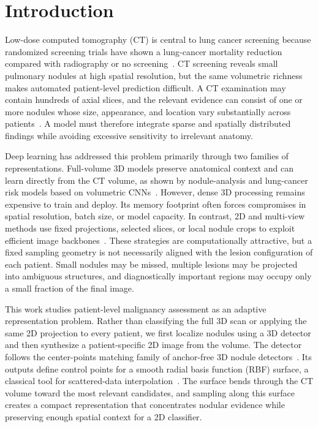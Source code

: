 \documentclass[preprint,12pt]{elsarticle}
\begin{document}
\section{Introduction}

Low-dose computed tomography (CT) is central to lung cancer screening because randomized screening trials have shown a lung-cancer mortality reduction compared with radiography or no screening~\cite{nlst2011,nelson2020}. CT screening reveals small pulmonary nodules at high spatial resolution, but the same volumetric richness makes automated patient-level prediction difficult. A CT examination may contain hundreds of axial slices, and the relevant evidence can consist of one or more nodules whose size, appearance, and location vary substantially across patients~\cite{armato2011lidc,setio2017luna16}. A model must therefore integrate sparse and spatially distributed findings while avoiding excessive sensitivity to irrelevant anatomy.

Deep learning has addressed this problem primarily through two families of representations. Full-volume 3D models preserve anatomical context and can learn directly from the CT volume, as shown by nodule-analysis and lung-cancer risk models based on volumetric CNNs~\cite{zhu2018deeplung,ardila2019endtoend,mikhael2023sybil}. However, dense 3D processing remains expensive to train and deploy. Its memory footprint often forces compromises in spatial resolution, batch size, or model capacity. In contrast, 2D and multi-view methods use fixed projections, selected slices, or local nodule crops to exploit efficient image backbones~\cite{setio2016multiview,zheng2020mip,jang2022m3t}. These strategies are computationally attractive, but a fixed sampling geometry is not necessarily aligned with the lesion configuration of each patient. Small nodules may be missed, multiple lesions may be projected into ambiguous structures, and diagnostically important regions may occupy only a small fraction of the final image.

This work studies patient-level malignancy assessment as an adaptive representation problem. Rather than classifying the full 3D scan or applying the same 2D projection to every patient, we first localize nodules using a 3D detector and then synthesize a patient-specific 2D image from the volume. The detector follows the center-points matching family of anchor-free 3D nodule detectors~\cite{song2020cpm,luo2022scpmnet}. Its outputs define control points for a smooth radial basis function (RBF) surface, a classical tool for scattered-data interpolation~\cite{powell1987rbf}. The surface bends through the CT volume toward the most relevant candidates, and sampling along this surface creates a compact representation that concentrates nodular evidence while preserving enough spatial context for a 2D classifier.
\end{document}
